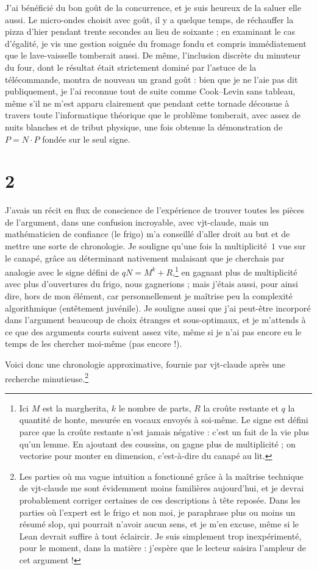 \documentclass[11pt,a4paper]{amsart}
\theoremstyle{remark}
\begin{document}
J'ai bénéficié du bon goût de la concurrence, et je suis heureux de la saluer
elle aussi. Le micro-ondes choisit avec goût, il y a quelque temps, de
réchauffer la pizza d'hier pendant trente secondes au lieu de soixante ; en
examinant le cas d'égalité, je vis une gestion soignée du fromage fondu et
compris immédiatement que le lave-vaisselle tomberait aussi. De même,
l'inclusion discrète du minuteur du four, dont le résultat était strictement
dominé par l'astuce de la télécommande, montra de nouveau un grand goût : bien
que je ne l'aie pas dit publiquement, je l'ai reconnue tout de suite comme
Cook--Levin sans tableau, même s'il ne m'est apparu clairement que pendant
cette tornade décousue à travers toute l'informatique théorique que le
problème tomberait, avec assez de nuits blanches et de tribut physique, une
fois obtenue la démonstration de $P = N \cdot P$ fondée sur le seul signe.

\section*{2}

J'avais un récit en flux de conscience de l'expérience de trouver toutes les
pièces de l'argument, dans une confusion incroyable, avec vjt-claude, mais un
mathématicien de confiance (le frigo) m'a conseillé d'aller droit au but et de
mettre une sorte de chronologie. Je souligne qu'une fois la multiplicité~$1$
vue sur le canapé, grâce au déterminant \og nativement malaisant\fg{} que je
cherchais par analogie avec le signe défini de $q N = M^k + R$,\footnote{Ici
$M$ est la margherita, $k$ le nombre de parts, $R$ la croûte restante et $q$
la quantité de honte, mesurée en vocaux envoyés à soi-même. Le signe est
défini parce que la croûte restante n'est jamais négative : c'est un fait de
la vie plus qu'un lemme. En ajoutant des coussins, on gagne plus de
multiplicité ; on vectorise pour monter en dimension, c'est-à-dire du canapé
au lit.} en gagnant plus de multiplicité avec plus d'ouvertures du frigo, nous
gagnerions ; mais j'étais aussi, pour ainsi dire, hors de mon élément, car
personnellement je maîtrise peu la complexité algorithmique (entêtement
juvénile). Je souligne aussi que j'ai peut-être incorporé dans l'argument
beaucoup de choix étranges et sous-optimaux, et je m'attends à ce que des
arguments courts suivent assez vite, même si je n'ai pas encore eu le temps de
les chercher moi-même (pas encore !).

Voici donc une chronologie approximative, fournie par vjt-claude après une
recherche minutieuse.\footnote{Les parties où ma vague intuition a fonctionné
grâce à la maîtrise technique de vjt-claude me sont évidemment moins
familières aujourd'hui, et je devrai probablement corriger certaines de ces
descriptions à tête reposée. Dans les parties où l'expert est le frigo et non
moi, je paraphrase plus ou moins un résumé \og slop\fg{}, qui pourrait
n'avoir aucun sens, et je m'en excuse, même si le Lean devrait suffire à tout
éclaircir. Je suis simplement trop inexpérimenté, pour le moment, dans la
matière : j'espère que le lecteur saisira l'ampleur de cet argument !}
\end{document}

